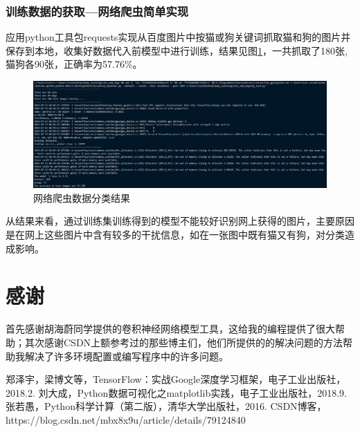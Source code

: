 \documentclass[a4paper,11pt]{ctexart}
\theoremstyle{break}
\theoremstyle{plain}
\begin{document}
\subsubsection{训练数据的获取---网络爬虫简单实现}
应用python工具包requests实现从百度图片中按猫或狗关键词抓取猫和狗的图片并保存到本地，收集好数据代入前模型中进行训练，结果见图\ref{fig:test_spyder}，一共抓取了180张,猫狗各90张，正确率为57.76\%。
\begin{figure}
	\centering
	\includegraphics[width=\linewidth]{test_spyder.png}
	\caption{网络爬虫数据分类结果\label{fig:test_spyder}}
\end{figure}
从结果来看，通过训练集训练得到的模型不能较好识别网上获得的图片，主要原因是在网上这些图片中含有较多的干扰信息，如在一张图中既有猫又有狗，对分类造成影响。
\section*{感谢}
首先感谢胡海蔚同学提供的卷积神经网络模型工具，这给我的编程提供了很大帮助；其次感谢CSDN上额参考过的那些博主们，他们所提供的的解决问题的方法帮助我解决了许多环境配置或编写程序中的许多问题。
\newpage
\begin{thebibliography}{99}
	\songti %
	郑泽宇，梁博文等，TensorFlow：实战Google深度学习框架，电子工业出版社，2018.2.
	刘大成，Python数据可视化之matplotlib实践，电子工业出版社，2018.9.
	张若愚，Python科学计算（第二版），清华大学出版社，2016.
	CSDN博客，https://blog.csdn.net/mbx8x9u/article/details/79124840
\end{thebibliography}
\end{document}
